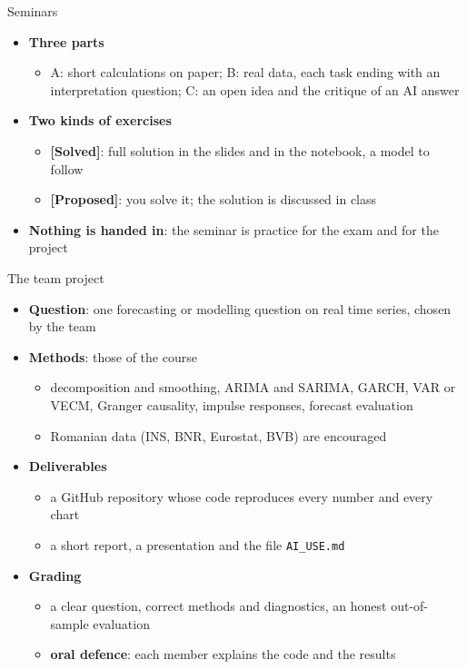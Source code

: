 \begin{frame}{Seminars}
\itemsize{\small}
\begin{itemize}
    \item \textbf{Three parts}
    \begin{itemize}
        \item A: short calculations on paper; B: real data, each task ending with an interpretation question; C: an open idea and the critique of an AI answer
    \end{itemize}
    \item \textbf{Two kinds of exercises}
    \begin{itemize}
        \item \textbf{[Solved]}: full solution in the slides and in the notebook, a model to follow
        \item \textbf{[Proposed]}: you solve it; the solution is discussed in class
    \end{itemize}
    \item \textbf{Nothing is handed in}: the seminar is practice for the exam and for the project
\end{itemize}
\end{frame}

\begin{frame}{The team project}
\itemsize{\small}
\begin{itemize}
    \item \textbf{Question}: one forecasting or modelling question on real time series, chosen by the team
    \item \textbf{Methods}: those of the course
    \begin{itemize}
        \item decomposition and smoothing, ARIMA and SARIMA, GARCH, VAR or VECM, Granger causality, impulse responses, forecast evaluation
        \item Romanian data (INS, BNR, Eurostat, BVB) are encouraged
    \end{itemize}
    \item \textbf{Deliverables}
    \begin{itemize}
        \item a GitHub repository whose code reproduces every number and every chart
        \item a short report, a presentation and the file \texttt{AI\_USE.md}
    \end{itemize}
    \item \textbf{Grading}
    \begin{itemize}
        \item a clear question, correct methods and diagnostics, an honest out-of-sample evaluation
        \item \textbf{oral defence}: each member explains the code and the results
    \end{itemize}
\end{itemize}
\end{frame}

